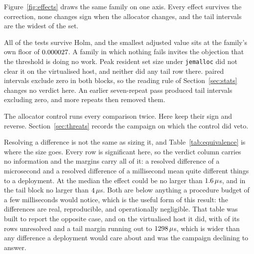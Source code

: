 \documentclass[english,oneside,a4paper,censored,csm,software-track-2020]{HYthesisML}
\begin{document}
Figure~\ref{fig:effects} draws the same family on one axis. Every effect survives the correction,
none changes sign when the allocator changes, and the tail intervals are the widest of the set.

All \NSignificant{} of the \NTests{} tests survive Holm, and the smallest adjusted value sits at
the family's own floor of $0.000027$. A family in which nothing fails invites the objection
that the threshold is doing no work. Peak resident set size under \texttt{jemalloc} did not
clear it on the virtualised host, and neither did any tail row there. \NExclZero{} paired
intervals exclude zero in both blocks, so the reading rule of Section~\ref{sec:stats} changes no
verdict here. An earlier seven-repeat pass produced tail intervals excluding zero, and more
repeats then removed them.

The allocator control runs every comparison twice. Here \CrossAllocConsistent{} keep their sign
and \NCrossAllocReversed{} reverse. Section~\ref{sec:threats} records the campaign on which the
control did veto.

Resolving a difference is not the same as sizing it, and Table~\ref{tab:equivalence} is where the
size goes. Every row is significant here, so the verdict column carries no information and the
margins carry all of it: a resolved difference of a microsecond and a resolved difference of a
millisecond mean quite different things to a deployment. At the median the effect could be no larger
than $1.6\,\mu$s, and in the tail block no larger than $4\,\mu$s. Both are
below anything a procedure budget of a few milliseconds would notice, which is the useful form of
this result: the differences are real, reproducible, and operationally negligible. That table was
built to report the opposite case, and on the virtualised host it did, with
\GuestNEqvUnresolved{} of its \GuestNEqvRows{} rows unresolved and a tail margin running out to
$1298\,\mu$s, which is wider than any difference a deployment would care about and
was the campaign declining to answer.
\end{document}

